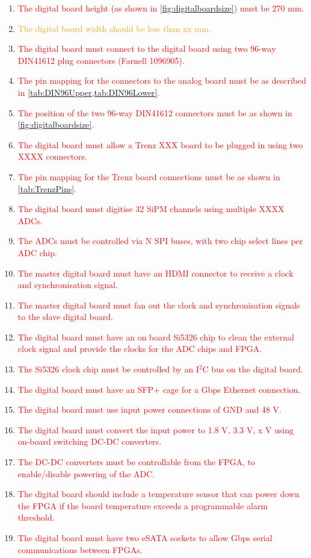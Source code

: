 \documentclass[a4paper]{article}
\newcommand{\must}[1]{\textcolor{red}{#1}}
\newcommand{\should}[1]{\textcolor{orange}{#1}}
\def\I2C{I$^2$C}
\begin{document}
\begin{enumerate}
    \item \must{The digital board height (as shown in \cref{fig:digitalboardsize}) must be 270 mm.}
    \item \should{The digital board width should be less than xx mm.}
    \item \must{The digital board must connect to the digital board using two 96-way DIN41612 plug connectors (Farnell 1096905).}
    \item \must{The pin mapping for the connectors to the analog board must be as described in \cref{tab:DIN96Upper,tab:DIN96Lower}.}
    \item \must{The position of the two 96-way DIN41612 connectors must be as shown in \cref{fig:digitalboardsize}.}
    \item \must{The digital board must allow a Trenz XXX board to be plugged in using two XXXX connectors.}
    \item \must{The pin mapping for the Trenz board connections must be as shown in \cref{tab:TrenzPins}.}
    \item \must{The digital board must digitise 32 SiPM channels using multiple XXXX ADCs.}
    \item \must{The ADCs must be controlled via N SPI buses, with two chip select lines per ADC chip.}
    \item \must{The master digital board must have an HDMI connector to receive a clock and synchronisation signal.}
    \item \must{The master digital board must fan out the clock and synchronisation signals to the slave digital board.}
    \item \must{The digital board must have an on board Si5326 chip to clean the external clock signal and provide the clocks for the ADC chips and FPGA.}
    \item \must{The Si5326 clock chip must be controlled by an \I2C bus on the digital board.}
    \item \must{The digital board must have an SFP+ cage for a Gbps Ethernet connection.}
    \item \must{The digital board must use input power connections of GND and 48 V.}
    \item \must{The digital board must convert the input power to 1.8 V, 3.3 V, x V using on-board switching DC-DC converters.}
    \item \must{The DC-DC converters must be controllable from the FPGA, to enable/disable powering of the ADC.}
    \item \must{The digital board should include a temperature sensor that can power down the FPGA if the board temperature exceeds a programmable alarm threshold.}
    \item \must{The digital board must have two eSATA sockets to allow Gbps serial communications between FPGAs.}
\end{enumerate}
\end{document}
